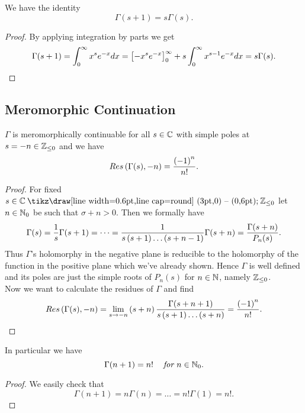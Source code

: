 \begin{theorem}
	We have the identity
\begin{equation*}
	\Gamma(s + 1) = s \Gamma(s).
\end{equation*}
\end{theorem}
\begin{proof}
	By applying integration by parts we get
\begin{equation*}
	\Gamma(s + 1) = \int _0 ^\infty x^{s} e^{-x} dx =\left[-x^s e^{-x}\right] _0 ^\infty + s \int _0 ^\infty x^{s - 1} e^{-x} dx = s\Gamma(s).
\end{equation*}
\end{proof}


\subsection{Meromorphic Continuation}


\begin{theorem}
	$\Gamma$ is meromorphically continuable for all $s \in \mathbb{C}$ with simple poles at $s = -n\in \mathbb{Z} _{\leq 0}$ and we have
\begin{equation*}
	Res\left(\Gamma(s), -n\right) = \frac{\left(-1\right)^n}{n!}.
\end{equation*}
\end{theorem}
\begin{proof}
	For fixed $s \in \field{C} \mysetminus \field{Z}_{\leq 0}$ let $n \in \mathbb{N}_0$ be such that $\sigma + n > 0$. Then we formally have
\begin{equation*}
	\Gamma(s) = \frac{1}{s} \Gamma(s + 1) = \dots = \frac{1}{s \left(s + 1\right) \dots \left(s + n - 1\right)} \Gamma(s + n) = \frac{\Gamma(s + n)}{P_n(s)}.
\end{equation*}
	Thus $\Gamma$'s holomorphy in the negative plane is reducible to the holomorphy of the function in the positive plane which we've already shown. Hence $\Gamma$ is well defined and its poles are just the simple roots of $P_n(s)$ for $n \in \mathbb{N}$, namely $\mathbb{Z}_{\leq 0}$. \\
	Now we want to calculate the residues of $\Gamma$ and find
\begin{equation*}
	Res\left(\Gamma(s), -n\right) = \lim\limits_{s \to -n} \left(s + n\right) \frac{\Gamma(s + n + 1)}{s \left(s + 1\right) \dots \left(s + n\right)} = \frac{\left(-1\right)^n}{n!}.
\end{equation*}
\end{proof}


\begin{lemma}
	In particular we have
\begin{equation*}
	\Gamma(n + 1) = n! \hspace{0.3cm} \textit{ for } n \in \mathbb{N}_0.
\end{equation*}
\end{lemma}
\begin{proof}
	We easily check that
\begin{equation*}
	\Gamma(n + 1) = n \Gamma(n) = \dots = n! \Gamma(1) = n!.
\end{equation*}
\end{proof}


